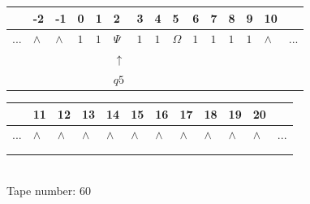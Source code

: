 \documentclass[11pt]{article}
\begin{document}
\begin{table}[H]
\centering
\begin{tabular}{lllllllllllllll}
 & -2 & -1 & 0 & 1 & 2 & 3 & 4 & 5 & 6 & 7 & 8 & 9 & 10 & \\
\hline
$...$ & \multicolumn{1}{|l|}{$\wedge$} & \multicolumn{1}{|l|}{$\wedge$} & \multicolumn{1}{|l|}{$1$} & \multicolumn{1}{|l|}{$1$} & \multicolumn{1}{|l|}{$\Psi$} & \multicolumn{1}{|l|}{$1$} & \multicolumn{1}{|l|}{$1$} & \multicolumn{1}{|l|}{$\Omega$} & \multicolumn{1}{|l|}{$1$} & \multicolumn{1}{|l|}{$1$} & \multicolumn{1}{|l|}{$1$} & \multicolumn{1}{|l|}{$1$} & \multicolumn{1}{|l|}{$\wedge$} & $...$\\
\hline
&  &  &  &  & $\uparrow$ &  &  &  &  &  &  &  &  &  \\
&  &  &  &  & $ q5 $ &  &  &  &  &  &  &  &  &  \\
\end{tabular}
\begin{tabular}{llllllllllll}
 & 11 & 12 & 13 & 14 & 15 & 16 & 17 & 18 & 19 & 20 & \\
\hline
$...$ & \multicolumn{1}{|l|}{$\wedge$} & \multicolumn{1}{|l|}{$\wedge$} & \multicolumn{1}{|l|}{$\wedge$} & \multicolumn{1}{|l|}{$\wedge$} & \multicolumn{1}{|l|}{$\wedge$} & \multicolumn{1}{|l|}{$\wedge$} & \multicolumn{1}{|l|}{$\wedge$} & \multicolumn{1}{|l|}{$\wedge$} & \multicolumn{1}{|l|}{$\wedge$} & \multicolumn{1}{|l|}{$\wedge$} & $...$\\
\hline
&  &  &  &  &  &  &  &  &  &  &  \\
&  &  &  &  &  &  &  &  &  &  &  \\
\end{tabular}
\\
Tape number: 60
\noindent\makebox[\linewidth]{\hdashrule{\textwidth}{1pt}{1pt}}\end{table}
\end{document}
